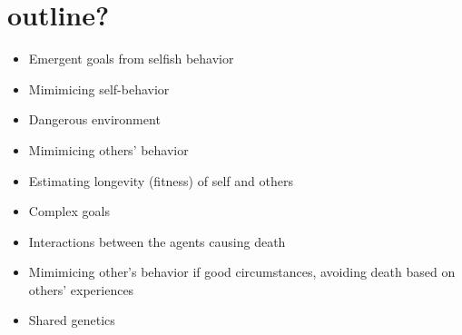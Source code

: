 \documentclass[a4paper]{article}
\begin{document}
\section*{outline?}

\begin{itemize}
\item   Emergent goals from selfish behavior
\item   Mimimicing self-behavior
\item   Dangerous environment
\item   Mimimicing others' behavior
\item   Estimating longevity (fitness) of self and others
\item   Complex goals
\item   Interactions between the agents causing death
\item   Mimimicing other's behavior if good circumstances, avoiding death
    based on others' experiences
\item   Shared genetics
\end{itemize}
\end{document}
